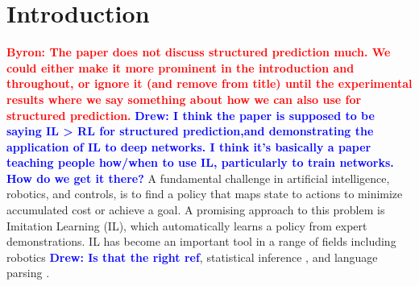 \documentclass{article}
\newcommand{\BB}[1]{\textcolor{red}{\bf Byron: {#1}}}
\newcommand{\drew}[1]{\textcolor{blue}{\bf Drew: {#1}}}
\begin{document}
\begin{abstract}
Deep learning models are advancing the state of the art in structured prediction, but increasingly require training that goes beyond traditional supervised learning regimes. \cite{} Researchers have begun adopting reinforcement learning algorithms to train such structued predictors. We argue here that \textit{AggrevaTeD}-- a policy gradient extension of the Imitation Learning approach of \cite{Ross}-- leads to faster and better solutions with less training data then relying on less-informed RL techniques.  With both feedforward and recurrent neural predictors, we demonstrate stochastic gradient procedures to solve high dimensional continuous control problems as well as a partially observed dependency parsing task from raw image data. Backing our empirical findings, we provide a comprehensive theoretical study of IL that demonstrates we can expect \textit{exponentially} lower sample complexity for learning with \textit{AggrevateD} then with Reinforcement Learning algorithms. In both practice and in theory \drew{should we carefullly note this int he appendix since this has been a point of confusion for some folks?} we observe that the approach can achieve performance beyond that of the demonstrator when the demonstrator is sub-optimal. \drew{Needs some work. bb take pass.}
\end{abstract}



\section{Introduction}
\label{sec:intro}
\BB{The paper does not discuss structured prediction much. We could either make it more prominent in the introduction and throughout, or ignore it (and remove from title) until the experimental results where we say something about how we can also use for structured prediction.} \drew{I think the paper is supposed to be saying IL > RL for structured prediction,and demonstrating the application of IL to deep networks. I think it's basically a paper teaching people how/when to use IL, particularly to train networks. How do we get it there?} 
A fundamental challenge in artificial intelligence, robotics, and controls, is to find a policy that maps state to actions to minimize accumulated cost or achieve a goal. A promising approach to this problem is Imitation Learning (IL), which automatically learns a policy from expert demonstrations.  IL has become an important tool in a range of fields including robotics \cite{Ross2011_AISTATS} \drew{Is that the right ref}, statistical inference \cite{ross2011_CVPR,sun2016learning}, and language parsing \cite{chang2015learning_dependency}. 
\end{document}
